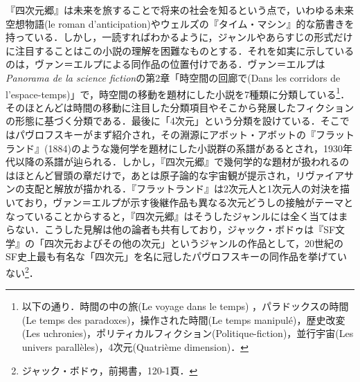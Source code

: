 『四次元郷』は未来を旅することで将来の社会を知るという点で，いわゆる未来空想物語(le roman d'anticipation)やウェルズの『タイム・マシン』的な筋書きを持っている．しかし，一読すればわかるように，ジャンルやあらすじの形式だけに注目することはこの小説の理解を困難なものとする．それを如実に示しているのは，ヴァン＝エルプによる同作品の位置付けである．ヴァン＝エルプは\emph{Panorama de la science fiction}の第2章「時空間の回廊で(Dans les corridors de l'espace-temps)」で，時空間の移動を題材にした小説を7種類に分類している\footnote{以下の通り．時間の中の旅(Le voyage dans le temps) ，パラドックスの時間(Le temps des paradoxes)，操作された時間(Le temps manipulé)，歴史改変(Les uchronies)，ポリティカルフィクション(Politique-fiction)，並行宇宙(Les univers parallèles)，4次元(Quatrième dimension)．}．そのほとんどは時間の移動に注目した分類項目やそこから発展したフィクションの形態に基づく分類である．最後に「4次元」という分類を設けている．そこではパヴロフスキーがまず紹介され，その淵源にアボット・アボットの『フラットランド』(1884)のような幾何学を題材にした小説群の系譜があるとされ，1930年代以降の系譜が辿られる．しかし，『四次元郷』で幾何学的な題材が扱われるのはほとんど冒頭の章だけで，あとは原子論的な宇宙観が提示され，リヴァイアサンの支配と解放が描かれる．『フラットランド』は2次元人と1次元人の対決を描いており，ヴァン＝エルプが示す後継作品も異なる次元どうしの接触がテーマとなっていることからすると，『四次元郷』はそうしたジャンルには全く当てはまらない．こうした見解は他の論者も共有しており，ジャック・ボドゥは『SF文学』の「四次元およびその他の次元」というジャンルの作品として，20世紀のSF史上最も有名な「四次元」を名に冠したパヴロフスキーの同作品を挙げていない\footnote{ジャック・ボドゥ，前掲書，120-1頁． }．

